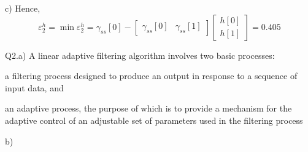 \documentclass[12pt]{article}
\begin{document}
\noindent
c)
Hence,
\begin{equation}
	\varepsilon_{2}^{h}=\min\varepsilon_{2}^{h}=\gamma_{ss}[0]-
	\left[
	\begin{array}{cc}
		\gamma_{ss}[0]&\gamma_{ss}[1]
	\end{array}
	\right]
	\left[
	\begin{array}
		{c}
		h[0]\\
		h[1]
	\end{array}
	\right]=0.405
\end{equation}

\noindent
Q2.a)
A linear adaptive filtering algorithm involves two basic processes: 
\begin{inparaenum}[(1)]
	\item a filtering process designed to produce an output in response to a sequence of input data, and
	\item an adaptive process, the purpose of which is to provide a mechanism for the adaptive control of an adjustable set of parameters used in the filtering process
\end{inparaenum}

\noindent
b)
\end{document}
